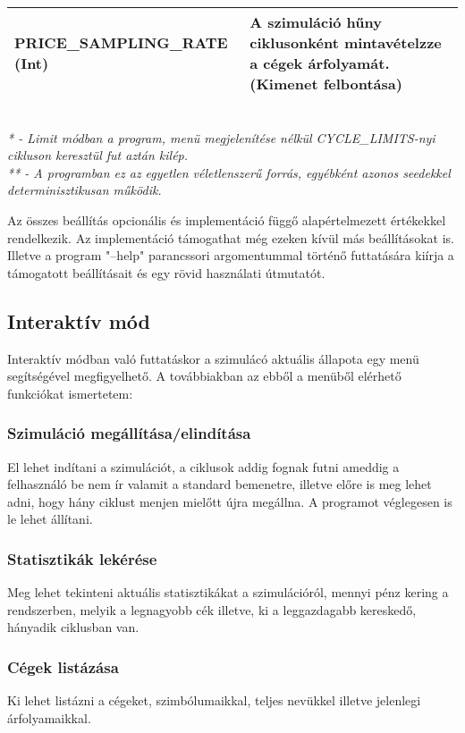 \documentclass[./terv.tex]{subfiles}
\begin{document}
\begin{center}
\begin{tabular}{ | p{5.5cm} || p{5.5cm} | }
            \hline
            \textbf{PRICE\_SAMPLING\_RATE (Int)} & A szimuláció hűny ciklusonként mintavételzze a cégek árfolyamát. (Kimenet felbontása) \\
            \hline
        \end{tabular}\\
        \textit{* - Limit módban a program, menü megjelenítése nélkül CYCLE\_LIMITS-nyi cikluson keresztül fut aztán kilép.} \\
        \textit{** - A programban ez az egyetlen véletlenszerű forrás, egyébként azonos seedekkel determinisztikusan működik.}
    \end{center}
    Az összes beállítás opcionális és implementáció függő alapértelmezett értékekkel rendelkezik.
    Az implementáció támogathat még ezeken kívül más beállításokat is.
    Illetve a program "--help" parancssori argomentummal történő futtatására kiírja a támogatott beállításait és egy rövid használati útmutatót.


    \subsection{Interaktív mód}
    Interaktív módban való futtatáskor a szimulácó aktuális állapota egy menü segítségével megfigyelhető.
    A továbbiakban az ebből a menüből elérhető funkciókat ismertetem:

    \subsubsection{Szimuláció megállítása/elindítása}
    El lehet indítani a szimulációt, a ciklusok addig fognak futni ameddig a felhasználó be nem ír valamit a standard bemenetre, illetve előre is meg lehet adni, hogy hány ciklust menjen mielőtt újra megállna.
    A programot véglegesen is le lehet állítani.

    \subsubsection{Statisztikák lekérése}
    Meg lehet tekinteni aktuális statisztikákat a szimulációról, mennyi pénz kering a rendszerben, melyik a legnagyobb cék illetve, ki a leggazdagabb kereskedő, hányadik ciklusban van.

    \subsubsection{Cégek listázása}
    Ki lehet listázni a cégeket, szimbólumaikkal, teljes nevükkel illetve jelenlegi árfolyamaikkal.
\end{document}
